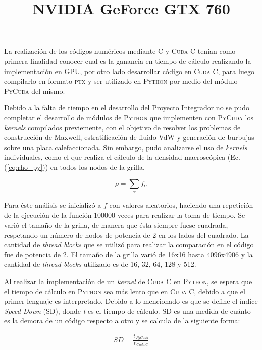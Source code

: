 La realización de los códigos numéricos mediante \textsc{C} y \textsc{Cuda C} tenían como primera finalidad conocer cual es la ganancia en tiempo de cálculo realizando la implementación en GPU, por otro lado desarrollar código en \textsc{Cuda C}, para luego compilarlo en formato \textsc{ptx} y ser utilizado en \textsc{Python} por medio del módulo \textsc{PyCuda} del mismo.

Debido a la falta de tiempo en el desarrollo del Proyecto Integrador no se pudo completar el desarrollo de módulos de \textsc{Python} que implementen con \textsc{PyCuda} los \textit{kernels} compilados previemente, con el objetivo de resolver los problemas de construcción de Maxwell, estratificación de fluido VdW y generación de burbujas sobre una placa calefaccionada.  Sin embargo, pudo analizarse el uso de \textit{kernels} individuales, como el que realiza el cálculo de la densidad macroscópica (Ec. (\ref{eq:rho_py})) en todos los nodos de la grilla.

\begin{equation}
\rho = \sum_{\alpha} f_{\alpha}
\label{eq:rho_py}
\end{equation}

Para éste análisis se inicializó a $f$ con valores aleatorios, haciendo una repetición de la ejecución de la función 100000 veces para realizar la toma de tiempo. Se varió el tamaño de la grilla, de manera que ésta siempre fuese cuadrada, respetando un número de nodos de potencia de 2 en los lados del cuadrado. La cantidad de \textit{thread blocks} que se utilizó para realizar la comparación en el código fue de potencia de 2. El tamaño de la grilla varió de 16x16 hasta 4096x4906 y la cantidad de \textit{thread blocks} utilizado es de 16, 32, 64, 128 y 512.

Al  realizar la implementación de un \textit{kernel} de \textsc{Cuda C} en \textsc{Python}, se espera que el tiempo de cálculo en \textsc{Python} sea más lento que en \textsc{Cuda C}, debido a que el primer lenguaje es interpretado. Debido a lo mencionado es que se define el índice \textit{Speed Down} (SD), donde \textit{t} es el tiempo de cálculo. SD es una medida de cuánto es la demora de un código respecto a otro y se calcula de la siguiente forma:

\begin{align}
SD = \frac{t_{\>PyCuda}}{t_{\>Cuda \> C}} 
\end{align} 

\newpage

\title{\textbf{NVIDIA GeForce GTX 760}}
\newline

